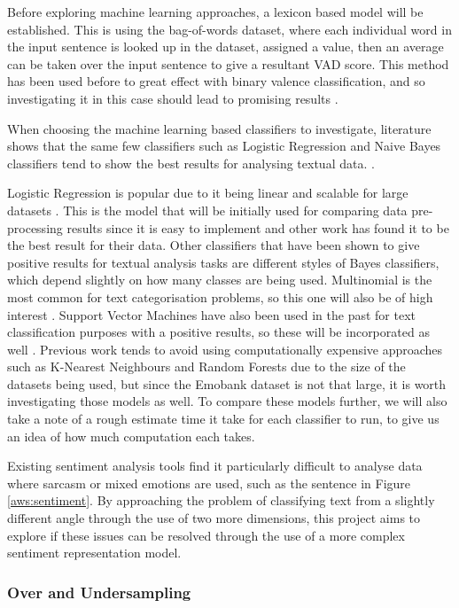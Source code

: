 Before exploring machine learning approaches, a lexicon based model will be established. This is using the bag-of-words dataset, \cite{wordsData} where each individual word in the input sentence is looked up in the dataset, assigned a value, then an average can be taken over the input sentence to give a resultant VAD score. This method has been used before to great effect with binary valence classification, and so investigating it in this case should lead to promising results \cite{kolchyna2015twitter}.

When choosing the machine learning based classifiers to investigate, literature shows that the same few classifiers such as Logistic Regression and Naive Bayes classifiers tend to show the best results for analysing textual data.\cite{kolchyna2015twitter} \cite{frank2006naive}.

Logistic Regression is popular due to it being linear and scalable for large datasets \cite{towardsDS}. This is the model that will be initially used for comparing data pre-processing results since it is easy to implement and other work has found it to be the best result for their data. 
Other classifiers that have been shown to give positive results for textual analysis tasks are different styles of Bayes classifiers,  which depend slightly on how many classes are being used. Multinomial is the most common for text categorisation problems, so this one will also be of high interest \cite{frank2006naive}. Support Vector Machines have also been used in the past for text classification purposes with a positive results, so these will be incorporated as well \cite{joachims1998text}. Previous work tends to avoid using computationally expensive approaches such as K-Nearest Neighbours and Random Forests due to the size of the datasets being used, but since the Emobank dataset is not that large, it is worth investigating those models as well. To compare these models further, we will also take a note of a rough estimate time it take for each classifier to run, to give us an idea of how much computation each takes.

Existing sentiment analysis tools find it particularly difficult to analyse data where sarcasm or mixed emotions are used, such as the sentence in Figure \ref{aws:sentiment}. By approaching the problem of classifying text from a slightly different angle through the use of two more dimensions, this project aims to explore if these issues can be resolved through the use of a more complex sentiment representation model.

\subsubsection{Over and Undersampling}

